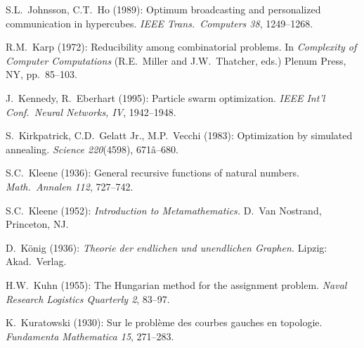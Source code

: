 \begin{thebibliography}{999}






S.L.~Johnsson, C.T.~Ho (1989):
Optimum broadcasting and personalized communication in hypercubes.
{\it IEEE Trans.~Computers 38}, 1249--1268.



R.M.~Karp (1972): Reducibility among combinatorial problems.  In {\it
Complexity of Computer Computations} (R.E.~Miller and J.W.~Thatcher,
eds.)  Plenum Press, NY, pp.~85--103.

J.~Kennedy, R.~Eberhart (1995): 
Particle swarm optimization.  {\it IEEE Int'l Conf.~Neural
Networks, IV}, 1942--1948.

S.~Kirkpatrick, C.D.~Gelatt Jr., M.P.~Vecchi (1983):
Optimization by simulated annealing.  {\it Science 220}(4598),
671â--680.

S.C.~Kleene (1936): General recursive functions of natural numbers.
{\it Math.~Annalen 112}, 727--742.

S.C.~Kleene (1952):
{\it Introduction to Metamathematics.}
D.~Van Nostrand, Princeton, NJ.


D.~K\"onig (1936):
{\it Theorie der endlichen und unendlichen Graphen.}  Lipzig: Akad.~Verlag.

H.W.~Kuhn (1955): The Hungarian method for the assignment problem.
{\it Naval Research Logistics Quarterly 2}, 83--97.

K.~Kuratowski (1930):
Sur le probl\`{e}me des courbes gauches en topologie.
{\it Fundamenta Mathematica 15}, 271--283. 




\end{thebibliography}
